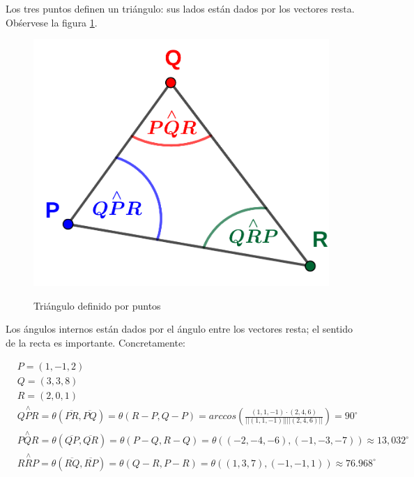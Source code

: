 \documentclass{article}
\begin{document}
Los tres puntos definen un triángulo: sus lados están dados por los vectores resta. Obśervese la figura \ref{fig:1-8-a}.

\begin{figure}[ht]
\caption{Triángulo definido por puntos}
\includegraphics[scale=1]{img/ejercicios/1/8-a.png} 
\centering
\label{fig:1-8-a}
\end{figure}

Los ángulos internos están dados por el ángulo entre los vectores resta; el sentido de la recta es importante. Concretamente:

\begin{subequations}
\begin{align}
& P = (1, -1, 2) \\
& Q = (3, 3, 8) \\
& R = (2, 0, 1) \\
& Q\overset{\wedge}{P}R = \theta(\overline{PR}, \overline{PQ}) = \theta(R-P, Q-P) = arccos \left(\frac{(1,1,-1) \cdot (2, 4, 6)}{||(1, 1, -1)|| ||(2,4,6)||} \right) = 90^{\circ} \\
& P\overset{\wedge}{Q}R = \theta(\overline{QP}, \overline{QR}) = \theta(P-Q, R-Q) = \theta((-2,-4,-6),(-1, -3, -7)) \approx 13,032^{\circ} \\
& R\overset{\wedge}{R}P = \theta(\overline{RQ}, \overline{RP}) = \theta(Q-R, P-R) = \theta((1,3,7),(-1, -1, 1)) \approx 76.968^{\circ}
\end{align}
\end{subequations}
\end{document}
